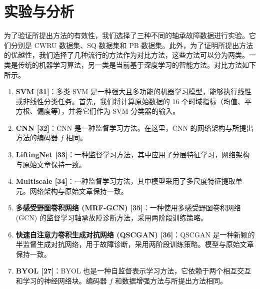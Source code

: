 \documentclass[master]{thesis-uestc}
\begin{document}
\section{实验与分析}
为了验证所提出方法的有效性，我们选择了三种不同的轴承故障数据进行实验。它们分别是 CWRU 数据集、SQ 数据集和 PB 数据集。此外，为了证明所提出方法的优越性，我们选择了几种流行的方法作为对比方法，这些方法可以分为两类。一类是传统的机器学习算法，另一类是当前基于深度学习的智能方法。对比方法如下所示。
\begin{enumerate}
    \item \textbf{SVM [31]}：多类 SVM 是一种强大且多功能的机器学习模型，能够执行线性或非线性分类任务。首先，我们将计算原始数据的 16 个时域指标（均值、平方根、偏度等），并将它们作为 SVM 分类器的输入。

    \item \textbf{CNN [32]}：CNN 是一种监督学习方法。在这里，CNN 的网络架构与所提出方法的编码器 \(f\) 相同。

    \item \textbf{LiftingNet [33]}：一种监督学习方法，其中应用了分层特征学习，网络架构与原始文章保持一致。

    \item \textbf{Multiscale [34]}：一种监督学习方法，其中模型采用了多尺度特征提取单元。网络架构与原始文章保持一致。

    \item \textbf{多感受野图卷积网络 (MRF-GCN) [35]}：一种使用多感受野图卷积网络 (GCN) 的监督学习轴承故障诊断方法，采用两阶段训练策略。

    \item \textbf{快速自注意力卷积生成对抗网络 (QSCGAN) [36]}：QSCGAN 是一种新颖的半监督生成对抗网络，用于故障诊断，采用两阶段训练策略。模型与原始文章保持一致。

    \item \textbf{BYOL [27]}：BYOL 也是一种自监督表示学习方法，它依赖于两个相互交互和学习的神经网络块。编码器 \(f\) 和数据增强方法与所提出方法相同。
\end{enumerate}
\end{document}
